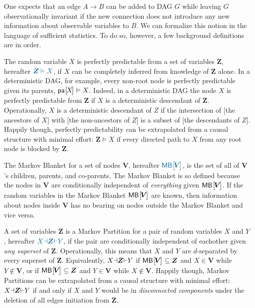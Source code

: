 One expects that an edge $A\to B$ can be added to DAG $G$ while leaving $G$ observationally invariant if the new connection does not introduce any new information about observable variables to $B$. %
We can formalize this notion in the language of sufficient statistics. To do so, however, a few background definitions are in order.

 The random variable $X$ is perfectly predictable from a set of variables $\bm{Z}$, hereafter $\mblue{\bm{Z}\vDash X}$, if $X$ can be completely inferred from knowledge of $\bm{Z}$ alone. In a deterministic DAG, for example, every non-root node is perfectly predictable given its parents, ${\NamedFunction{pa}{\!X\!}\vDash X}$. Indeed, in a deterministic DAG the node $X$ is perfectly predictable from $\bm{Z}$ if $X$ is a deterministic descendant of $\bm{Z}$. Operationally, $X$ is a deterministic descendant of $Z$ if the intersection of {[the ancestors of $X$]} with {[the non-ancestors of $Z$]} is a subset of {[the descendants of $Z$]}. Happily though, perfectly predictability can be extrapolated from a causal structure with minimal effort: ${\bm{Z}\vDash X}$ if every directed path to $X$ from any root node is blocked by $\bm{Z}$. 

 The Markov Blanket for a set of nodes $\bm{V}$, hereafter $\mblue{\NamedFunction{MB}{\!\bm{V}\!}}$, is the set of all of $\bm{V}$'s children, parents, and co-parents. The Markov Blanket is so defined because the nodes in $\bm{V}$ are conditionally independent of \emph{everything} given $\NamedFunction{MB}{\!\bm{V}\!}$. If the random variables in the Markov Blanket $\NamedFunction{MB}{\!\bm{V}\!}$ are known, then information about nodes inside $\bm{V}$ has no bearing on nodes outside the Markov Blanket and vice versa.

  A set of variables $\bm{Z}$ is a Markov Partition for a pair of random variables $X$ and $Y$, hereafter $\mblue{X\cramp{\dashv}\bm{Z}\cramp{\vdash}Y}$, if the pair are conditionally independent of eachother given \emph{any superset} of $\bm{Z}$. Operationally, this means that $X$ and $Y$ are $d$-separated by every superset of $\bm{Z}$. Equivalently, ${X\mathord{\dashv}\bm{Z}\mathord{\vdash}Y}$ if $\NamedFunction{MB}{\!\bm{V}\!}\subseteq \bm{Z}$ and $X\in \bm{V}$ while $Y\not\in \bm{V}$, or if $\NamedFunction{MB}{\!\bm{V}\!}\subseteq \bm{Z}$ and $Y\in \bm{V}$ while $X\not\in \bm{V}$. Happily though, Markov Partitions can be extrapolated from a causal structure with minimal effort: ${X\mathord{\dashv}\bm{Z}\mathord{\vdash}Y}$ if and only if $X$ and $Y$ would be in \emph{disconnected components} under the deletion of all edges initiation from $\bm{Z}$. 

